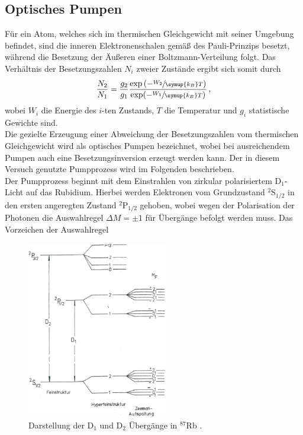 \subsection{Optisches Pumpen}
Für ein Atom, welches sich im thermischen Gleichgewicht mit seiner Umgebung befindet, sind die inneren Elektronenschalen gemäß des Pauli-Prinzips besetzt, während die Besetzung der Äußeren einer Boltzmann-Verteilung folgt. Das Verhältnis der Besetzungszahlen $N_i$ zweier Zustände ergibt sich somit durch
\begin{equation}
  \frac{N_2}{N_1}=\frac{g_2}{g_1}\frac{\exp\left(-\sfrac{W_2}{\symup{k_B}T}\right)}{\exp(-\sfrac{W_1}{\symup{k_B}T})}\,,
  \label{eq:thermisch}
\end{equation}
wobei $W_i$ die Energie des $i$-ten Zustands, $T$ die Temperatur und $g_i$ statistische Gewichte sind.\\
Die gezielte Erzeugung einer Abweichung der Besetzungszahlen vom thermischen Gleichgewicht wird als optisches Pumpen bezeichnet, wobei bei ausreichendem Pumpen auch eine Besetzungsinversion erzeugt werden kann. Der in diesem Versuch genutzte Pumpprozess wird im Folgenden beschrieben.\\
Der Pumpprozess beginnt mit dem Einstrahlen von zirkular polarisiertem D$_1$-Licht auf das Rubidium. Hierbei werden Elektronen vom Grundzustand $^2$S$_{1/2}$ in den ersten angeregten Zustand $^2$P$_{1/2}$ gehoben, wobei wegen der Polarisation der Photonen die Auswahlregel $\Delta M=\pm1$ für Übergänge befolgt werden muss. Das Vorzeichen der Auswahlregel
\begin{figure}
  \centering
  \includegraphics[width=0.55\textwidth]{Bilder/D1}
  \caption{Darstellung der D$_1$ und D$_2$ Übergänge in $^{87}$Rb \cite{D1}.}
\end{figure}

